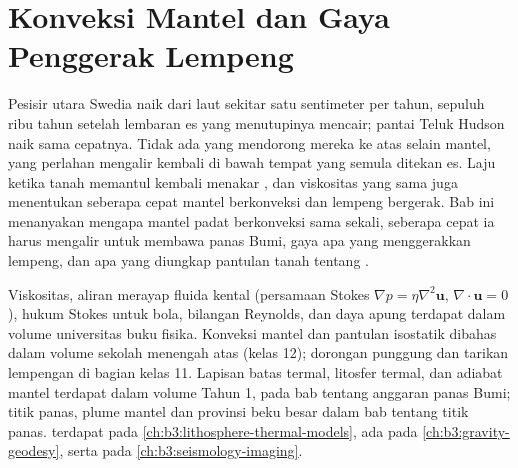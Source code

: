 \chapter{Konveksi Mantel dan Gaya Penggerak Lempeng}\label{ch:b3:mantle-convection}

Pesisir utara Swedia naik dari laut sekitar satu sentimeter per
tahun, sepuluh ribu tahun setelah lembaran es yang menutupinya mencair; pantai
Teluk Hudson naik sama cepatnya. Tidak ada yang mendorong mereka ke atas selain mantel,
yang perlahan mengalir kembali di bawah tempat yang semula ditekan es. Laju
ketika tanah memantul kembali menakar , dan viskositas
yang sama juga menentukan seberapa cepat mantel berkonveksi dan lempeng bergerak. Bab ini
menanyakan mengapa mantel padat berkonveksi sama sekali, seberapa cepat ia harus mengalir
untuk membawa panas Bumi, gaya apa yang menggerakkan lempeng, dan apa yang
diungkap pantulan tanah tentang .

\begin{recall}
Viskositas, aliran merayap fluida kental (persamaan Stokes
$\nabla p = \eta\nabla^2\mathbf u$, $\nabla\cdot\mathbf u = 0$), hukum Stokes
untuk bola, bilangan Reynolds, dan daya apung terdapat dalam
volume universitas buku fisika. Konveksi mantel dan pantulan isostatik dibahas
dalam volume sekolah menengah atas (kelas 12); dorongan punggung dan tarikan lempengan di bagian kelas 11.
Lapisan batas termal, litosfer termal, dan adiabat mantel terdapat
dalam volume Tahun 1, pada bab tentang anggaran panas Bumi; titik panas,
plume mantel dan provinsi beku besar dalam bab tentang titik panas.  terdapat pada \cref{ch:b3:lithosphere-thermal-models},
 ada pada \cref{ch:b3:gravity-geodesy}, serta
 pada \cref{ch:b3:seismology-imaging}.
\end{recall}

